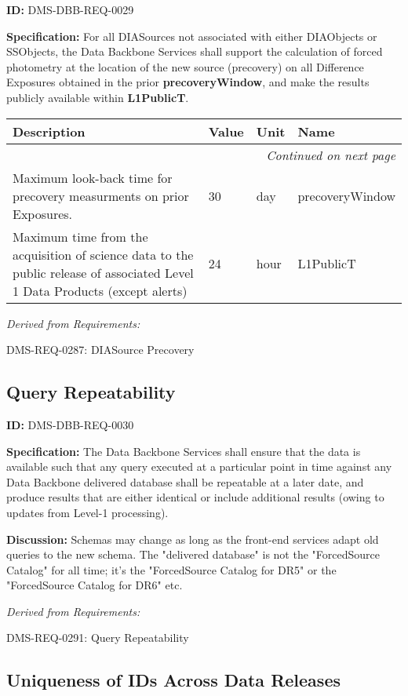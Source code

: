 \documentclass[SE,toc]{lsstdoc}
\makeatletter
\newcommand{\paramname}[1]{\hspace{0pt}#1}
\newcommand{\unitname}[1]{\hspace{0pt}#1}
\newenvironment{parameters}[0]{%
\setlength\LTleft{0pt}
\setlength\LTright{\fill}
\begin{small}
\begin{longtable}[]{|p{0.49\textwidth}|l|p{0.6in}|p{1.70in}@{}|}

\hline \textbf{Description} & \textbf{Value} & \textbf{Unit} & \textbf{Name} \\ \hline
\endhead

\hline \multicolumn{4}{r}{\emph{Continued on next page}} \\
\endfoot

\hline\hline
\endlastfoot
}{%
\hline
\end{longtable}
\end{small}
}
\makeatother
\begin{document}
\label{DMS-DBB-REQ-0029}
\textbf{ID:} DMS-DBB-REQ-0029

\textbf{Specification:}
For all DIASources not associated with either DIAObjects or SSObjects, the Data Backbone Services shall support the calculation of forced photometry at the location of the new source (precovery) on all Difference Exposures obtained in the prior \textbf{precoveryWindow}, and make the results publicly available within \textbf{L1PublicT}.

\begin{parameters}
Maximum look-back time for precovery measurments on prior Exposures.
&
30
&
\unitname{%
day
}
&
\paramname{%
precoveryWindow
} \\\hline
Maximum time from the acquisition of science data to the public release of associated Level 1 Data Products (except alerts)
&
24
&
\unitname{%
hour
}
&
\paramname{%
L1PublicT
} \\\hline
\end{parameters}

\emph{Derived from Requirements:}

DMS-REQ-0287:
DIASource Precovery \newline

\subsection{Query Repeatability}

\label{DMS-DBB-REQ-0030}
\textbf{ID:} DMS-DBB-REQ-0030

\textbf{Specification:}
The Data Backbone Services shall ensure that the data is available such that any query executed at a particular point in time against any Data Backbone delivered database shall be repeatable at a later date, and produce results that are either identical or include additional results (owing to updates from Level-1 processing).

\textbf{Discussion:}
Schemas may change as long as the front-end services adapt old queries to the new schema.   The "delivered database" is not the "ForcedSource Catalog" for all time; it's the "ForcedSource Catalog for DR5" or the "ForcedSource Catalog for DR6" etc.

\emph{Derived from Requirements:}

DMS-REQ-0291:
Query Repeatability \newline

\subsection{Uniqueness of IDs Across Data Releases}
\end{document}
